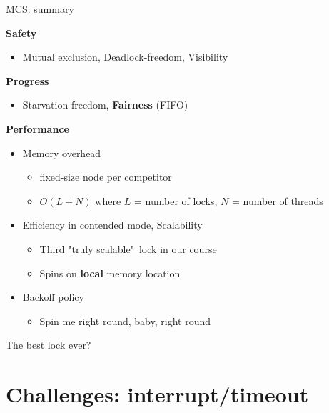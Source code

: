 \begin{frame}{MCS: summary}

\textbf{Safety}
\begin{itemize}
  \item Mutual exclusion, Deadlock-freedom, Visibility
\end{itemize}

\textbf{Progress}
\begin{itemize}
  \item Starvation-freedom, \textbf{Fairness} (FIFO)
\end{itemize}

\textbf{Performance}
\begin{itemize}
  \item Memory overhead
  \begin{itemize}
    \item fixed-size node per competitor
    \item $O(L+N)$ where $L$ = number of locks, $N$ = number of threads
  \end{itemize}
  \item Efficiency in contended mode, Scalability
  \begin{itemize}
    \item Third "truly scalable"\ lock in our course
    \item Spins on \textbf{local} memory location
  \end{itemize}  
  \item Backoff policy  
  \begin{itemize}
    \item Spin me right round, baby, right round
  \end{itemize}  
\end{itemize}

\pause

The best lock ever?

\end{frame}


\section{Challenges: interrupt/timeout}
\showTOC

